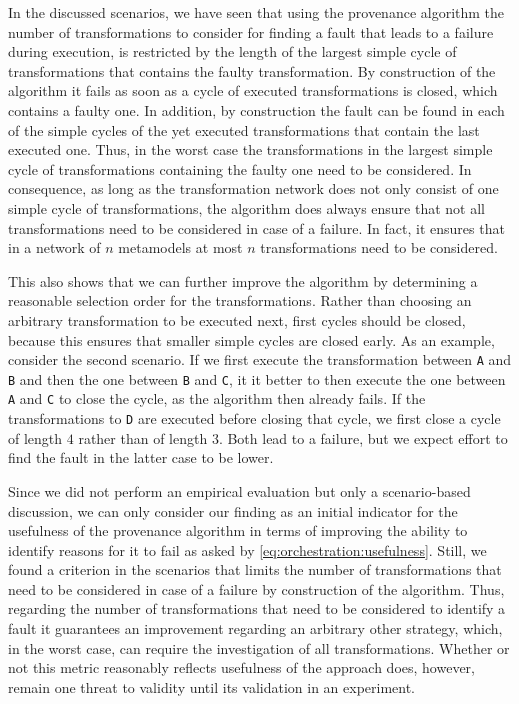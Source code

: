 In the discussed scenarios, we have seen that using the provenance algorithm the number of transformations to consider for finding a fault that leads to a failure during execution, is restricted by the length of the largest simple cycle of transformations that contains the faulty transformation.
By construction of the algorithm it fails as soon as a cycle of executed transformations is closed, which contains a faulty one.
In addition, by construction the fault can be found in each of the simple cycles of the yet executed transformations that contain the last executed one.
Thus, in the worst case the transformations in the largest simple cycle of transformations containing the faulty one need to be considered.
In consequence, as long as the transformation network does not only consist of one simple cycle of transformations, the algorithm does always ensure that not all transformations need to be considered in case of a failure.
In fact, it ensures that in a network of $n$ metamodels at most $n$ transformations need to be considered.

This also shows that we can further improve the algorithm by determining a reasonable selection order for the transformations.
Rather than choosing an arbitrary transformation to be executed next, first cycles should be closed, because this ensures that smaller simple cycles are closed early.
As an example, consider the second scenario.
If we first execute the transformation between \texttt{A} and \texttt{B} and then the one between \texttt{B} and \texttt{C}, it it better to then execute the one between \texttt{A} and \texttt{C} to close the cycle, as the algorithm then already fails.
If the transformations to \texttt{D} are executed before closing that cycle, we first close a cycle of length $4$ rather than of length $3$. Both lead to a failure, but we expect effort to find the fault in the latter case to be lower.

Since we did not perform an empirical evaluation but only a scenario-based discussion, we can only consider our finding as an initial indicator for the usefulness of the provenance algorithm in terms of improving the ability to identify reasons for it to fail as asked by \autoref{eq:orchestration:usefulness}.
Still, we found a criterion in the scenarios that limits the number of transformations that need to be considered in case of a failure by construction of the algorithm.
Thus, regarding the number of transformations that need to be considered to identify a fault it guarantees an improvement regarding an arbitrary other strategy, which, in the worst case, can require the investigation of all transformations.
Whether or not this metric reasonably reflects usefulness of the approach does, however, remain one threat to validity until its validation in an experiment.

